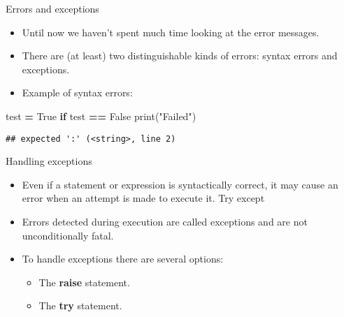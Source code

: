 \documentclass[
  8pt,
  ignorenonframetext,
]{beamer}
\newenvironment{Shaded}{\begin{snugshade}}{\end{snugshade}}
\newcommand{\BuiltInTok}[1]{#1}
\newcommand{\ControlFlowTok}[1]{\textcolor[rgb]{0.13,0.29,0.53}{\textbf{#1}}}
\newcommand{\NormalTok}[1]{#1}
\newcommand{\OperatorTok}[1]{\textcolor[rgb]{0.81,0.36,0.00}{\textbf{#1}}}
\newcommand{\StringTok}[1]{\textcolor[rgb]{0.31,0.60,0.02}{#1}}
\newcommand{\VariableTok}[1]{\textcolor[rgb]{0.00,0.00,0.00}{#1}}
\providecommand{\tightlist}{%
  \setlength{\itemsep}{0pt}\setlength{\parskip}{0pt}}
\begin{document}
\begin{frame}[fragile]{Errors and exceptions}
\protect\hypertarget{errors-and-exceptions}{}
\begin{itemize}
\item
  Until now we haven't spent much time looking at the error messages.
\item
  There are (at least) two distinguishable kinds of errors: syntax
  errors and exceptions.
\item
  Example of syntax errors:
\end{itemize}

\begin{Shaded}
\begin{Highlighting}[]
\NormalTok{test }\OperatorTok{=} \VariableTok{True}
\ControlFlowTok{if}\NormalTok{ test }\OperatorTok{==} \VariableTok{False}
  \BuiltInTok{print}\NormalTok{(}\StringTok{"Failed"}\NormalTok{)}
\end{Highlighting}
\end{Shaded}

\begin{verbatim}
## expected ':' (<string>, line 2)
\end{verbatim}
\end{frame}

\begin{frame}{Handling exceptions}
\protect\hypertarget{handling-exceptions}{}
\begin{itemize}
\item
  Even if a statement or expression is syntactically correct, it may
  cause an error when an attempt is made to execute it. Try except
\item
  Errors detected during execution are called exceptions and are not
  unconditionally fatal.
\item
  To handle exceptions there are several options:

  \begin{itemize}
  \tightlist
  \item
    The \textbf{raise} statement.
  \item
    The \textbf{try} statement.
  \end{itemize}
\end{itemize}
\end{frame}
\end{document}
